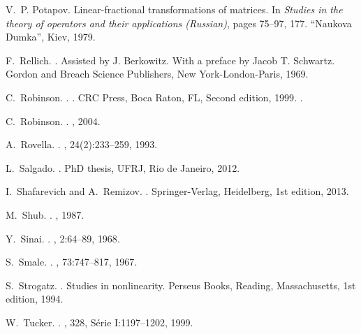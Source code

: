 \documentclass[12pt,reqno]{amsart}
\numberwithin{equation}{section}
\theoremstyle{plain}
\theoremstyle{definition}
\begin{document}
\begin{thebibliography}{10}
V.~P. Potapov.
\newblock Linear-fractional transformations of matrices.
\newblock In {\em Studies in the theory of operators and their applications
  ({R}ussian)}, pages 75--97, 177. ``Naukova Dumka'', Kiev, 1979.

F.~Rellich.
.
\newblock Assisted by J. Berkowitz. With a preface by Jacob T. Schwartz. Gordon
  and Breach Science Publishers, New York-London-Paris, 1969.

C.~Robinson.
.
. {CRC Press}, {Boca Raton, FL},
  {Second} edition, {1999}.
.

C.~Robinson.
.
, {2004}.

A.~Rovella.
.
, {24}({2}):{233--259}, {1993}.

L.~Salgado.
.
\newblock PhD thesis, UFRJ, Rio de Janeiro, {2012}.

I.~Shafarevich and A.~Remizov.
.
\newblock Springer-Verlag, Heidelberg, 1st edition, 2013.

M.~Shub.
.
, {1987}.

Y.~Sinai.
.
, {2}:{64--89}, {1968}.

S.~Smale.
.
, {73}:{747--817}, {1967}.

S.~Strogatz.
.
\newblock Studies in nonlinearity. Perseus Books, Reading, Massachusetts, 1st
  edition, 1994.

W.~Tucker.
.
, {328, S{\'e}rie I}:{1197--1202},
  {1999}.


\end{thebibliography}
\end{document}

